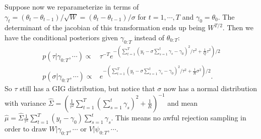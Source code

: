 \documentclass{article}\usepackage[]{graphicx}\usepackage[]{color}
\begin{document}
Suppose now we reparameterize in terms of $\gamma_t=(\theta_t-\theta_{t-1})/\sqrt{W}=(\theta_t - \theta_{t-1})/\sigma$ for $t=1,\cdots,T$ and $\gamma_0=\theta_0$. The determinant of the jacobian of this transformation ends up being $W^{T/2}$. Then we have the conditional posteriors given $\gamma_{0:T}$ instead of $\theta_{0:T}$:
\begin{align*}
  p(\tau|\gamma_{0:T},\cdots)\propto & \tau^{-T} e^{-\left(\sum_{t=1}^T(y_t-\sigma\sum_{s=1}^t\gamma_s - \gamma_0)^2/\tau^2 + \frac{1}{Q}\tau^2\right)/2}\\
  p(\sigma|\gamma_{0:T},\cdots)\propto & e^{-\left(\sum_{t=1}^T(y_t-\sigma\sum_{s=1}^t\gamma_s - \gamma_0)^2/\tau^2 + \frac{1}{R}\sigma^2\right)/2}.
\end{align*}
So $\tau$ still has a GIG distribution, but notice that $\sigma$ now has a normal distribution with variance $\hat{\Sigma}=\left(\frac{1}{\tau^2}\sum_{t=1}^T \left( \sum_{s=1}^t\gamma_s\right)^2 + \frac{1}{R}\right)^{-1}$ and mean $\hat{\mu}=\hat{\Sigma}\frac{1}{\tau^2}\sum_{t=1}^T(y_t-\gamma_0)\sum_{s=1}^t\gamma_s$. This means no awful rejection sampling in order to draw $W|\gamma_{0:T},\cdots$ or $V|\psi_{0:T},\cdots$.
\end{document}
